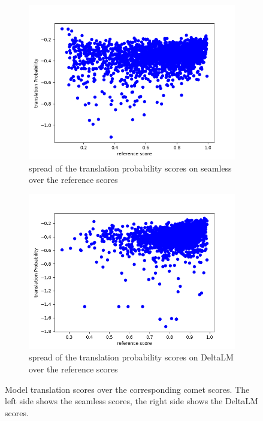 \begin{figure}[ht]
    \centering%
    \begin{subfigure}{0.4\linewidth}
        \includegraphics[width=\textwidth]{Latex/sections/images/seamlessgenprob.png}
        \caption{spread of the translation probability scores on seamless over the reference scores}
    \end{subfigure}
    \begin{subfigure}{0.4\linewidth}
        \includegraphics[width=\textwidth]{Latex/sections/images/dlmgenprob.png}
        \caption{spread of the translation probability scores on DeltaLM over the reference scores}
    \end{subfigure}
   \caption{Model translation scores over the corresponding comet scores. The left side shows the seamless scores, the right side shows the DeltaLM scores.}
    \label{fig:translationeval scatter plot translation}
    \end{figure}

